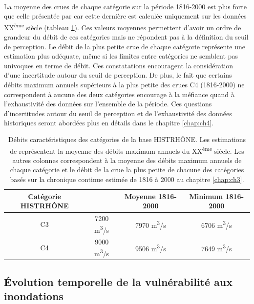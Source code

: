 	\paragraph{} La moyenne des crues de chaque catégorie sur la période 1816-2000 est plus forte que celle présentée par \citet{pichard_hydro-climatology_2017} car cette dernière est calculée uniquement sur les données XX\textsuperscript{ème} siècle (tableau \ref{tab:Qcateg}). Ces valeurs moyennes permettent d'avoir un ordre de grandeur du débit de ces catégories mais ne répondent pas à la définition du seuil de perception. Le débit de la plus petite crue de chaque catégorie représente une estimation plus adéquate, même si les limites entre catégories ne semblent pas univoques en terme de débit. Ces constatations encouragent la considération d'une incertitude autour du seuil de perception. De plus, le fait que certains débits maximum annuels supérieurs à la plus petite des crues C4 (1816-2000) ne correspondent à aucune des deux catégories encourage à la méfiance quand à l'exhaustivité des données sur l'ensemble de la période. Ces questions d'incertitudes autour du seuil de perception et de l'exhaustivité des données historiques seront abordées plus en détails dans le chapitre \ref{chap:ch4}.

	\begin{table}[h]
	\centering
	\caption{Débits caractéristiques des catégories de la base HISTRHÔNE. Les estimations de \citet{pichard_hydro-climatology_2017} représentent la moyenne des débits maximum annuels du XX\textsuperscript{ème} siècle. Les autres colonnes correspondent à la moyenne des débits maximum annuels de chaque catégorie et le débit de la crue la plus petite de chacune des catégories basés sur la chronique continue estimée de 1816 à 2000 au chapitre \ref{chap:ch3}.} 
	\label{tab:Qcateg}
		\begin{tabular}{|c|c|c|c|}
		\hline
		Catégorie HISTRHÔNE & \citet{pichard_hydro-climatology_2017} & Moyenne 1816-2000 & Minimum 1816-2000\\ \hline
		C3  & 7200 m\textsuperscript{3}/s  & 7970 m\textsuperscript{3}/s    & 6706 m\textsuperscript{3}/s   \\ \hline
		C4  & 9000 m\textsuperscript{3}/s  & 9506 m\textsuperscript{3}/s    & 7649 m\textsuperscript{3}/s   \\ \hline
		\end{tabular}
	\end{table}
	
	\subsection{Évolution temporelle de la vulnérabilité aux inondations}
	\label{subsec:EvolVuln}
	
